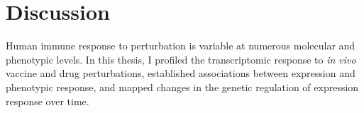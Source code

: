 %
%

\chapter{Discussion}
\label{ch:discussion}



Human immune response to perturbation is variable at numerous molecular and phenotypic levels.
In this thesis, I profiled the transcriptomic response to \textit{in vivo} vaccine and drug perturbations,
established associations between expression and phenotypic response,
and mapped changes in the genetic regulation of expression response over time.


